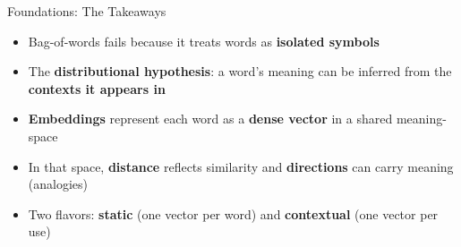 \documentclass[aspectratio=169]{beamer}
\begin{document}
\begin{frame}{Foundations: The Takeaways}
\vspace{0.3cm}
\begin{itemize}\setlength\itemsep{9pt}
  \item[\textcolor{wurgreen}{\faCheck}]
    Bag-of-words fails because it treats words as \textbf{isolated symbols}
  \item[\textcolor{wurgreen}{\faCheck}]
    The \textbf{distributional hypothesis}: a word's meaning can be inferred from the
    \textbf{contexts it appears in}
  \item[\textcolor{wurgreen}{\faCheck}]
    \textbf{Embeddings} represent each word as a \textbf{dense vector} in a shared
    meaning-space
  \item[\textcolor{wurgreen}{\faCheck}]
    In that space, \textbf{distance} reflects similarity and \textbf{directions} can carry
    meaning (analogies)
  \item[\textcolor{wurgreen}{\faCheck}]
    Two flavors: \textbf{static} (one vector per word) and \textbf{contextual}
    (one vector per use)
\end{itemize}

\medskip
{}
\end{frame}
\end{document}
